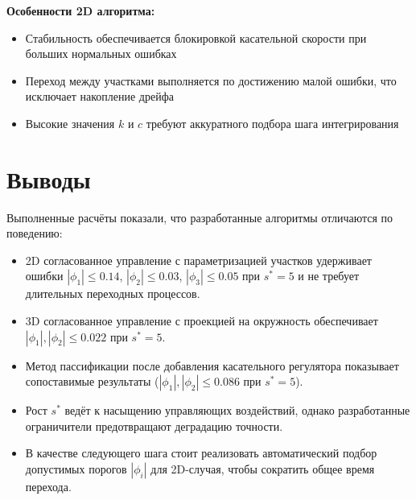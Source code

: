 \textbf{Особенности 2D алгоритма:}
\begin{itemize}
\item Стабильность обеспечивается блокировкой касательной скорости при больших нормальных ошибках
\item Переход между участками выполняется по достижению малой ошибки, что исключает накопление дрейфа
\item Высокие значения $k$ и $c$ требуют аккуратного подбора шага интегрирования
\end{itemize}

\section{Выводы}

Выполненные расчёты показали, что разработанные алгоритмы отличаются по поведению:

\begin{itemize}
\item 2D согласованное управление с параметризацией участков удерживает ошибки $|\phi_1| \leq 0.14$, $|\phi_2| \leq 0.03$, $|\phi_3| \leq 0.05$ при $s^* = 5$ и не требует длительных переходных процессов.
\item 3D согласованное управление с проекцией на окружность обеспечивает $|\phi_1|, |\phi_2| \leq 0.022$ при $s^* = 5$.
\item Метод пассификации после добавления касательного регулятора показывает сопоставимые результаты ($|\phi_1|, |\phi_2| \leq 0.086$ при $s^* = 5$).
\item Рост $s^*$ ведёт к насыщению управляющих воздействий, однако разработанные ограничители предотвращают деградацию точности.
\item В качестве следующего шага стоит реализовать автоматический подбор допустимых порогов $|\phi_i|$ для 2D-случая, чтобы сократить общее время перехода.
\end{itemize}

